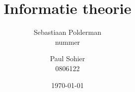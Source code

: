 \documentclass[a4paper,11pt]{report}
\begin{document}
\title{
  Informatie theorie
}
\author{
  Sebastiaan Polderman\\
  nummer
  \and
  Paul Sohier\\
  0806122
}
\date{\today}
\maketitle

\begin{abstract}\centering

\end{abstract}

\tableofcontents
{}

\setcounter{page}{3}




\end{document}
